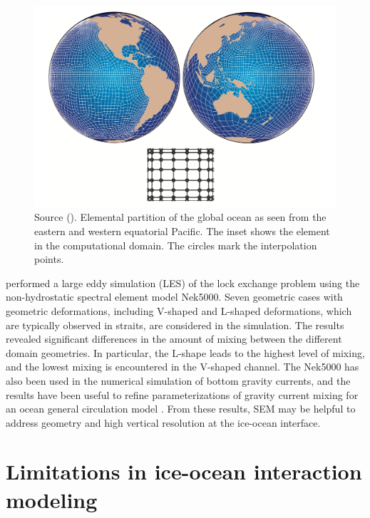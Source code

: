 \documentclass[11pt,a4paper]{article}
\begin{document}
	\begin{figure}[H]
	    \centering 
	    \includegraphics[width=13cm]{semGrid.png}
	    \caption{Source (\cite{iskandarani2002multi}). Elemental partition of the global ocean as seen from the eastern and western equatorial Pacific. The inset shows the element in the computational domain. The circles mark the interpolation points.}
	    \label{fig:5}
	\end{figure}
	
	
	
	\cite{ilicak2009non} performed a large eddy simulation (LES) of the lock exchange problem using the non-hydrostatic spectral element model Nek5000. 
	Seven geometric cases with geometric deformations, including V-shaped and L-shaped deformations, which are typically observed in straits, are considered in the simulation. The results revealed significant differences in the amount of mixing between the different domain geometries. In particular, the L-shape leads to the highest level of mixing, and the lowest mixing is encountered in the V-shaped channel. The Nek5000 has also been used in the numerical simulation of bottom gravity currents, and the results have been useful to refine parameterizations of gravity current mixing for an ocean general circulation model \citep{chang2005comparison, ilicak2009non}. From these results, SEM may be helpful to address geometry and high vertical resolution at the ice-ocean interface.

	
	
	\section{Limitations in ice-ocean interaction modeling}
	
\end{document}
